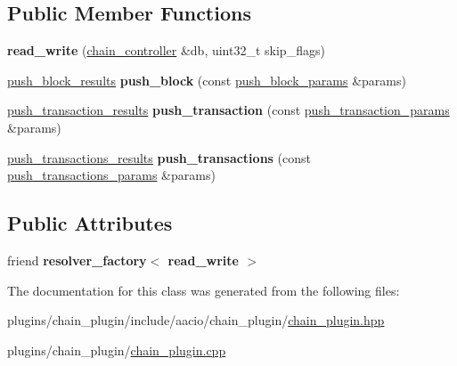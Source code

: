 \subsection*{Public Member Functions}
\begin{DoxyCompactItemize}
\item 
\mbox{\label{classaacio_1_1chain__apis_1_1read__write_ab4ab7371f3873e38fcb7afc4bfa31373}} 
{\bfseries read\+\_\+write} (\mbox{\hyperlink{classaacio_1_1chain_1_1chain__controller}{chain\+\_\+controller}} \&db, uint32\+\_\+t skip\+\_\+flags)
\item 
\mbox{\label{classaacio_1_1chain__apis_1_1read__write_ae5c8ce4da0de02b3e9b0193023ed48e7}} 
\mbox{\hyperlink{structaacio_1_1chain__apis_1_1empty}{push\+\_\+block\+\_\+results}} {\bfseries push\+\_\+block} (const \mbox{\hyperlink{structaacio_1_1chain_1_1signed__block}{push\+\_\+block\+\_\+params}} \&params)
\item 
\mbox{\label{classaacio_1_1chain__apis_1_1read__write_a27af3e84897cbb0975338ccef11264ed}} 
\mbox{\hyperlink{structaacio_1_1chain__apis_1_1read__write_1_1push__transaction__results}{push\+\_\+transaction\+\_\+results}} {\bfseries push\+\_\+transaction} (const \mbox{\hyperlink{classfc_1_1variant__object}{push\+\_\+transaction\+\_\+params}} \&params)
\item 
\mbox{\label{classaacio_1_1chain__apis_1_1read__write_aacf1538df22a245c9ac332b9e2e92dda}} 
\mbox{\hyperlink{classstd_1_1vector}{push\+\_\+transactions\+\_\+results}} {\bfseries push\+\_\+transactions} (const \mbox{\hyperlink{classstd_1_1vector}{push\+\_\+transactions\+\_\+params}} \&params)
\end{DoxyCompactItemize}
\subsection*{Public Attributes}
\begin{DoxyCompactItemize}
\item 
\mbox{\label{classaacio_1_1chain__apis_1_1read__write_a74cfc5c9dfa9a3d397a9551d5f2ca3fd}} 
friend {\bfseries resolver\+\_\+factory$<$ read\+\_\+write $>$}
\end{DoxyCompactItemize}


The documentation for this class was generated from the following files\+:\begin{DoxyCompactItemize}
\item 
plugins/chain\+\_\+plugin/include/aacio/chain\+\_\+plugin/\mbox{\hyperlink{chain__plugin_8hpp}{chain\+\_\+plugin.\+hpp}}\item 
plugins/chain\+\_\+plugin/\mbox{\hyperlink{chain__plugin_8cpp}{chain\+\_\+plugin.\+cpp}}\end{DoxyCompactItemize}
